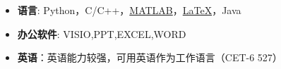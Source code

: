   \begin{itemize}[leftmargin=*]
    \item \textbf{语言}: Python，C/C++，\href{https://www.mathworks.com/}{MATLAB}，\href{https://www.latex-project.org/}{\LaTeX}，Java
    \item \textbf{办公软件}: VISIO,PPT,EXCEL,WORD
    \item \textbf{英语}：英语能力较强，可用英语作为工作语言（CET-6 527）
  \end{itemize}